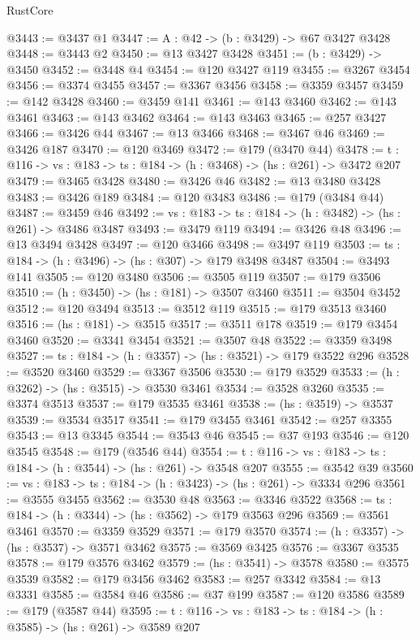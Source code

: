 \begin{lexlean}{RustCore}
\begin{coremodule}
@3443 := @3437 @1
@3447 := {A : @42} -> (b : @3429) -> @67 @3427 @3428
@3448 := @3443 @2
@3450 := @13 @3427 @3428
@3451 := (b : @3429) -> @3450
@3452 := @3448 @4
@3454 := @120 @3427 @119
@3455 := @3267 @3454
@3456 := @3374 @3455
@3457 := @3367 @3456
@3458 := @3359 @3457
@3459 := @142 @3428
@3460 := @3459 @141
@3461 := @143 @3460
@3462 := @143 @3461
@3463 := @143 @3462
@3464 := @143 @3463
@3465 := @257 @3427
@3466 := @3426 @44
@3467 := @13 @3466
@3468 := @3467 @46
@3469 := @3426 @187
@3470 := @120 @3469
@3472 := @179 (@3470 @44)
@3478 := {t : @116} -> {vs : @183} -> {ts : @184} -> (h : @3468) -> (hs : @261) -> @3472 @207
@3479 := @3465 @3428
@3480 := @3426 @46
@3482 := @13 @3480 @3428
@3483 := @3426 @189
@3484 := @120 @3483
@3486 := @179 (@3484 @44)
@3487 := @3459 @46
@3492 := {vs : @183} -> {ts : @184} -> (h : @3482) -> (hs : @261) -> @3486 @3487
@3493 := @3479 @119
@3494 := @3426 @48
@3496 := @13 @3494 @3428
@3497 := @120 @3466
@3498 := @3497 @119
@3503 := {ts : @184} -> (h : @3496) -> (hs : @307) -> @179 @3498 @3487
@3504 := @3493 @141
@3505 := @120 @3480
@3506 := @3505 @119
@3507 := @179 @3506
@3510 := (h : @3450) -> (hs : @181) -> @3507 @3460
@3511 := @3504 @3452
@3512 := @120 @3494
@3513 := @3512 @119
@3515 := @179 @3513 @3460
@3516 := (hs : @181) -> @3515
@3517 := @3511 @178
@3519 := @179 @3454 @3460
@3520 := @3341 @3454
@3521 := @3507 @48
@3522 := @3359 @3498
@3527 := {ts : @184} -> (h : @3357) -> (hs : @3521) -> @179 @3522 @296
@3528 := @3520 @3460
@3529 := @3367 @3506
@3530 := @179 @3529
@3533 := (h : @3262) -> (hs : @3515) -> @3530 @3461
@3534 := @3528 @3260
@3535 := @3374 @3513
@3537 := @179 @3535 @3461
@3538 := (hs : @3519) -> @3537
@3539 := @3534 @3517
@3541 := @179 @3455 @3461
@3542 := @257 @3355
@3543 := @13 @3345
@3544 := @3543 @46
@3545 := @37 @193
@3546 := @120 @3545
@3548 := @179 (@3546 @44)
@3554 := {t : @116} -> {vs : @183} -> {ts : @184} -> (h : @3544) -> (hs : @261) -> @3548 @207
@3555 := @3542 @39
@3560 := {vs : @183} -> {ts : @184} -> (h : @3423) -> (hs : @261) -> @3334 @296
@3561 := @3555 @3455
@3562 := @3530 @48
@3563 := @3346 @3522
@3568 := {ts : @184} -> (h : @3344) -> (hs : @3562) -> @179 @3563 @296
@3569 := @3561 @3461
@3570 := @3359 @3529
@3571 := @179 @3570
@3574 := (h : @3357) -> (hs : @3537) -> @3571 @3462
@3575 := @3569 @3425
@3576 := @3367 @3535
@3578 := @179 @3576 @3462
@3579 := (hs : @3541) -> @3578
@3580 := @3575 @3539
@3582 := @179 @3456 @3462
@3583 := @257 @3342
@3584 := @13 @3331
@3585 := @3584 @46
@3586 := @37 @199
@3587 := @120 @3586
@3589 := @179 (@3587 @44)
@3595 := {t : @116} -> {vs : @183} -> {ts : @184} -> (h : @3585) -> (hs : @261) -> @3589 @207

\end{coremodule}
\end{lexlean}
